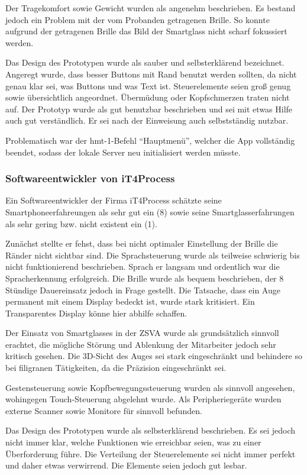 Der Tragekomfort sowie Gewicht wurden als angenehm beschrieben. Es bestand jedoch ein Problem mit der vom Probanden getragenen Brille. So konnte aufgrund der getragenen Brille das Bild der Smartglass nicht scharf fokussiert werden.

Das Design des Prototypen wurde als sauber und selbsterklärend bezeichnet. Angeregt wurde, dass besser Buttons mit Rand benutzt werden sollten, da nicht genau klar sei, was Buttons und was Text ist. Steuerelemente seien groß genug sowie übersichtlich angeordnet. Übermüdung oder Kopfschmerzen traten nicht auf. Der Prototyp wurde als gut benutzbar beschrieben und sei mit etwas Hilfe auch gut verständlich. Er sei nach der Einweisung auch selbstständig nutzbar.

Problematisch war der hmt-1-Befehl \enquote{Hauptmenü}, welcher die App vollständig beendet, sodass der lokale Server neu initialisiert werden müsste.
%
%
\subsubsection{Softwareentwickler von iT4Process}
Ein Softwareentwickler der Firma iT4Process schätzte seine Smartphoneerfahreungen als sehr gut ein (8) sowie seine Smartglasserfahrungen als sehr gering bzw. nicht existent ein (1).

Zunächst stellte er fehst, dass bei nicht optimaler Einstellung der Brille die Ränder nicht sichtbar sind. Die Sprachsteuerung wurde als teilweise schwierig bis nicht funktionierend beschrieben. Sprach er langsam und ordentlich war die Spracherkennung erfolgreich. Die Brille wurde als bequem beschrieben, der 8 Stündige Dauereinsatz jedoch in Frage gestellt. Die Tatsache, dass ein Auge permanent mit einem Display bedeckt ist, wurde stark kritisiert. Ein Transparentes Display könne hier abhilfe schaffen.

Der Einsatz von Smartglasses in der ZSVA wurde als grundsätzlich sinnvoll erachtet, die mögliche Störung und Ablenkung der Mitarbeiter jedoch sehr kritisch gesehen. Die 3D-Sicht des Auges sei stark eingeschränkt und behindere so bei filigranen Tätigkeiten, da die Präzision eingeschränkt sei.

Gestensteuerung sowie Kopfbewegungssteuerung wurden als sinnvoll angesehen, wohingegen Touch-Steuerung abgelehnt wurde. Als Peripheriegeräte wurden externe Scanner sowie Monitore für sinnvoll befunden.

Das Design des Prototypen wurde als selbsterklärend beschrieben. Es sei jedoch nicht immer klar, welche Funktionen wie erreichbar seien, was zu einer Überforderung führe. Die Verteilung der Steuerelemente sei nicht immer perfekt und daher etwas verwirrend. Die Elemente seien jedoch gut lesbar.


